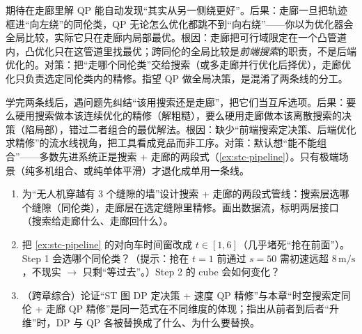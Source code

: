\begin{pitfall}
期待在走廊里解 QP 能自动发现“其实从另一侧绕更好”。后果：走廊一旦把轨迹框进“向左绕”的同伦类，QP 无论怎么优化都跳不到“向右绕”——你以为优化器会全局比较，实际它只在走廊内局部最优。根因：走廊把可行域限定在一个凸管道内，凸优化只在这管道里找最优；跨同伦的全局比较是\emph{前端搜索}的职责，不是后端优化的。对策：把“走哪个同伦类”交给搜索（或多走廊并行优化后择优），走廊优化只负责选定同伦类内的精修。指望 QP 做全局决策，是混淆了两条线的分工。
\end{pitfall}

\begin{pitfall}
学完两条线后，遇问题先纠结“该用搜索还是走廊”，把它们当互斥选项。后果：要么硬用搜索做本该连续优化的精修（解粗糙），要么硬用走廊做本该离散搜索的决策（陷局部），错过二者组合的最优解法。根因：缺少“前端搜索定决策、后端优化求精修”的流水线视角，把工具看成竞品而非工序。对策：默认想“能不能组合”——多数先进系统正是搜索 + 走廊的两段式（\cref{ex:stc-pipeline}）。只有极端场景（纯多机组合、或纯单体平滑）才退化成单用一条线。
\end{pitfall}

\begin{practice}
\begin{enumerate}
  \item 为“无人机穿越有 $3$ 个缝隙的墙”设计搜索 + 走廊的两段式管线：搜索层选哪个缝隙（同伦类），走廊层在选定缝隙里精修。画出数据流，标明两层接口（搜索给走廊什么、走廊回什么）。
  \item 把 \cref{ex:stc-pipeline} 的对向车时间窗改成 $t\in[1,6]$（几乎堵死“抢在前面”）。Step 1 会选哪个同伦类？（提示：抢在 $t{=}1$ 前通过 $s{=}50$ 需初速远超 $8\,\mathrm{m/s}$，不现实 $\to$ 只剩“等过去”。）Step 2 的 cube 会如何变化？
  \item （跨章综合）论证“ST 图 DP 定决策 + 速度 QP 精修”与本章“时空搜索定同伦 + 走廊 QP 精修”是同一范式在不同维度的体现；指出从前者到后者“升维”时，DP 与 QP 各被替换成了什么、为什么要替换。
\end{enumerate}
\end{practice}

